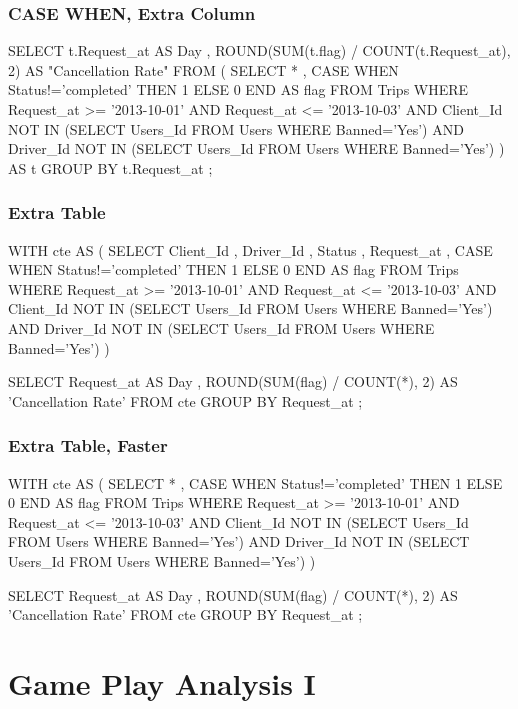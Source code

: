 \subsubsection{CASE WHEN, Extra Column}
\begin{Code}
SELECT
    t.Request_at AS Day
    , ROUND(SUM(t.flag) / COUNT(t.Request_at), 2) AS "Cancellation Rate"
FROM
    (
        SELECT
            *
            , CASE WHEN Status!='completed' THEN 1 ELSE 0 END AS flag
        FROM
            Trips
        WHERE
		    Request_at >= '2013-10-01' AND Request_at <= '2013-10-03'
            AND Client_Id NOT IN (SELECT Users_Id FROM Users WHERE Banned='Yes') 
            AND Driver_Id NOT IN (SELECT Users_Id FROM Users WHERE Banned='Yes')
    ) AS t
GROUP BY
    t.Request_at
;
\end{Code}

\subsubsection{Extra Table}
\begin{Code}
WITH cte AS
(
SELECT
    Client_Id
    , Driver_Id
    , Status
    , Request_at
    , CASE WHEN Status!='completed' THEN 1 ELSE 0 END AS flag
FROM
    Trips
WHERE
    Request_at >= '2013-10-01' AND Request_at <= '2013-10-03'
    AND Client_Id NOT IN (SELECT Users_Id FROM Users WHERE Banned='Yes')
    AND Driver_Id NOT IN (SELECT Users_Id FROM Users WHERE Banned='Yes')
)

SELECT
    Request_at AS Day
    , ROUND(SUM(flag) / COUNT(*), 2) AS 'Cancellation Rate'
FROM
    cte
GROUP BY
    Request_at
;
\end{Code}

\subsubsection{Extra Table, Faster}
\begin{Code}
WITH cte AS
(
SELECT
    *
    , CASE WHEN Status!='completed' THEN 1 ELSE 0 END AS flag
FROM
    Trips
WHERE
    Request_at >= '2013-10-01' AND Request_at <= '2013-10-03'
    AND Client_Id NOT IN (SELECT Users_Id FROM Users WHERE Banned='Yes')
    AND Driver_Id NOT IN (SELECT Users_Id FROM Users WHERE Banned='Yes')
)

SELECT
    Request_at AS Day
    , ROUND(SUM(flag) / COUNT(*), 2) AS 'Cancellation Rate'
FROM
    cte
GROUP BY
    Request_at
;
\end{Code}

\section{Game Play Analysis I} %
\label{sec:game-play-analysis-i}


